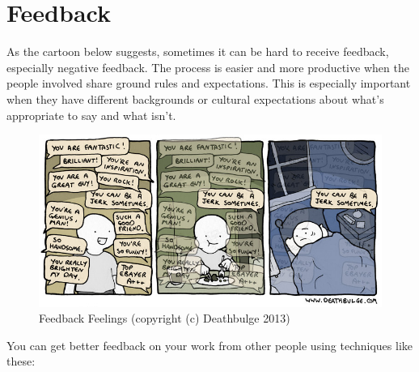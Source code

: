 \documentclass[10pt,statementpaper]{memoir}
\begin{document}
\section{Feedback}\label{feedback}

As the cartoon below suggests, sometimes it can be hard to receive
feedback, especially negative feedback. The process is easier and more
productive when the people involved share ground rules and expectations.
This is especially important when they have different backgrounds or
cultural expectations about what's appropriate to say and what isn't.

\begin{figure}
\centering
\includegraphics{fig/deathbulge-jerk.jpg}
\caption{Feedback Feelings (copyright (c) Deathbulge 2013)}
\end{figure}

You can get better feedback on your work from other people using
techniques like these:
\end{document}

